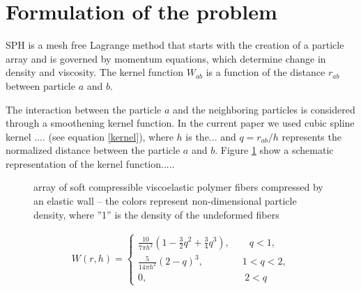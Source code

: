 \section{Formulation of the problem}
\label{Formulation}
SPH is a mesh free Lagrange method that starts with the creation of a particle array and is governed by momentum equations, which determine change in density and viscosity. The kernel function $W_{ab}$ is a function of the distance $r_{ab}$ between particle $a$ and $b$.

The interaction between the particle $a$ and the neighboring particles is considered through a smoothening kernel function. In the current paper we used cubic spline kernel .... (see equation \ref{kernel}), where $h$ is the... and $q=r_{ab}/h$ represents the normalized distance between the particle $a$ and $b$. Figure \ref{kernel_figure} show a schematic representation of the kernel function.....


\begin{figure}[h]
\centering
{} 
\caption{array of soft compressible viscoelastic polymer fibers compressed by an elastic wall – the colors represent non-dimensional particle density, where ”1” is the density of the undeformed fibers}
\label{kernel_figure}
\end{figure}


\begin{align}
\label{kernel}
W(r,h)=
\begin{cases}
\frac{10}{7 \pi h^2} \left( 1 - \frac{3}{2}q^2 + \frac{3}{4}q^3 \right), \qquad q<1,\\
\frac{5}{14 \pi h^2} \left( 2-q \right)^3, \qquad \qquad 1<q<2,\\
0, \qquad \qquad \qquad \qquad \qquad 2<q
\end{cases}
\end{align}

